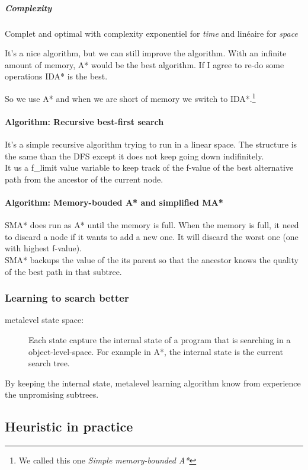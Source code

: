 \subparagraph{Complexity} Complet and  optimal with  complexity exponentiel for \textit{time}
and linéaire for \textit{space} 

It's a nice  algorithm, but we can still improve  the algorithm. With an
infinite amount of memory, A* would be the best algorithm. If I agree to
re-do  some operations  IDA* is  the  best. 

So  we  use A*  and when  we
are  short of  memory we  switch  to IDA*.\footnote{We  called this  one
\textit{Simple memory-bounded A*}}


\paragraph{Algorithm: Recursive best-first search}
It's a simple recursive algorithm trying to run in a linear space. The structure is 
the same than the DFS except it does not keep going down indifinitely.\\
It us a f\_limit value variable to keep track of the f-value of the best alternative path
from the ancestor of the current node.


\paragraph{Algorithm: Memory-bouded A* and simplified MA*}
SMA* does run as A* until the memory is full. When the memory is full, it need to discard a 
node if it wants to add a new one. It will discard the worst one (one with highest f-value).\\
SMA* backups the value of the its parent so that the ancestor knows the quality of the best
path in that subtree.


\subsubsection{Learning to search better}
\begin{description}
\item [metalevel state space:] Each state capture the internal state of a program that is searching in
a object-level-space. For example in A*, the internal state is the current search tree.
\end{description}
By keeping the internal state, metalevel learning algorithm know from experience the unpromising 
subtrees.

\subsection{Heuristic in practice}


